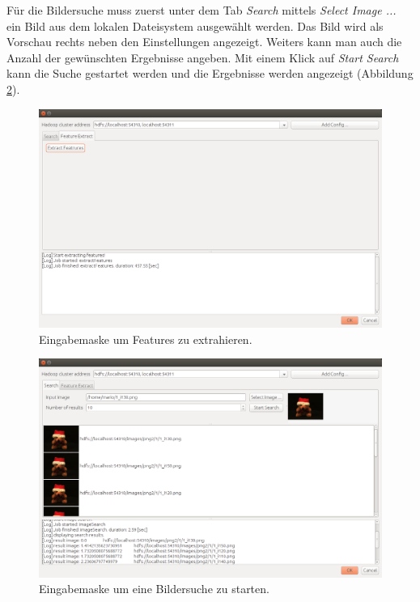 \documentclass[paper=a4, fontsize=11pt]{scrartcl} %
\numberwithin{equation}{section} %
\numberwithin{figure}{section} %
\numberwithin{table}{section} %
\begin{document}
Für die Bildersuche muss zuerst unter dem Tab \emph{Search} mittels \emph{Select Image ...} ein Bild aus dem lokalen Dateisystem ausgewählt werden. Das Bild wird als Vorschau rechts neben den Einstellungen angezeigt. Weiters kann man auch die Anzahl der gewünschten Ergebnisse angeben. Mit einem Klick auf \emph{Start Search} kann die Suche gestartet werden und die Ergebnisse werden angezeigt (Abbildung \ref{fig:s2}).

\begin{figure}[H]
\begin{center}
	\includegraphics[width=\textwidth]{images/screen1}
	\caption{Eingabemaske um Features zu extrahieren.}
	\label{fig:s1}
\end{center}
\end{figure}

\begin{figure}[H]
\begin{center}
	\includegraphics[width=\textwidth]{images/screen2}
	\caption{Eingabemaske um eine Bildersuche zu starten.}
	\label{fig:s2}
\end{center}
\end{figure}
\end{document}
